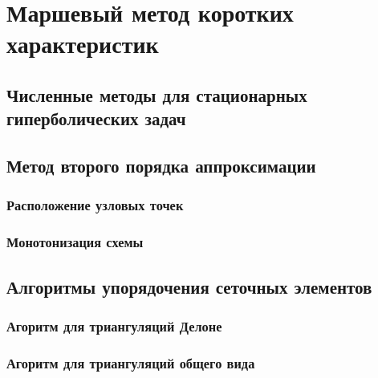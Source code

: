 \chapter{Маршевый метод коротких характеристик}

\section{Численные методы для стационарных гиперболических задач}

\section{Метод второго порядка аппроксимации}

\subsection{Расположение узловых точек}

\subsection{Монотонизация схемы}

\section{Алгоритмы упорядочения сеточных элементов}
\subsection{Агоритм для триангуляций Делоне}
\subsection{Агоритм для триангуляций общего вида}